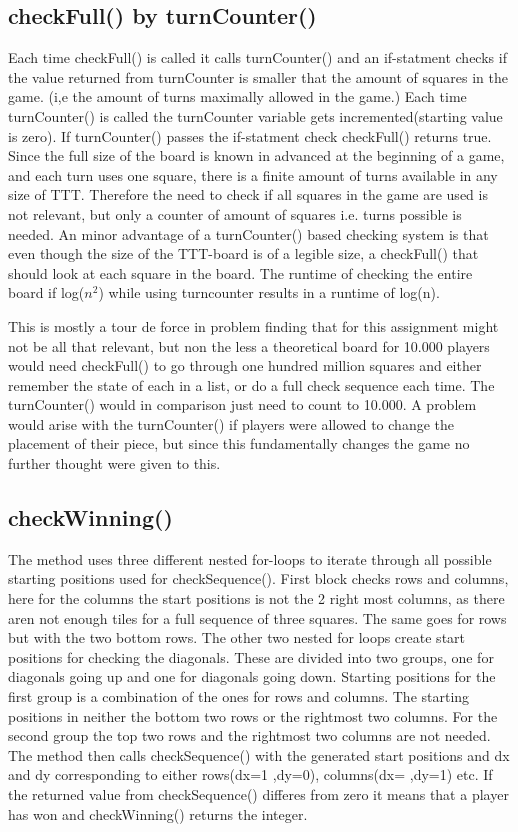 \documentclass[a4paper,10pt]{article}
\begin{document}
	\subsection{checkFull() by turnCounter()}
	Each time checkFull() is called it calls turnCounter() and an if-statment checks if the value returned from turnCounter is smaller that the amount of squares in the game. (i,e the amount of turns maximally allowed in the game.) Each time turnCounter() is called the turnCounter variable gets incremented(starting value is zero). If turnCounter() passes the if-statment check checkFull() returns true.
	Since the full size of the board is known in advanced at the beginning of a game, and each turn uses one square,  there is a finite amount of turns available in any size of TTT. Therefore the need to check if all squares in the game are used is not relevant, but only a counter of amount of squares i.e. turns possible is needed. 
	An minor advantage of a turnCounter() based checking system is that even though the size of the TTT-board is of a legible size, a checkFull() that should look at each square in the board. The runtime of checking the entire board if log($ n^{2} $) while using turncounter results in a runtime of log(n).
	
	This is mostly a tour de force in problem finding that for this assignment might not be all that relevant, but non the less a theoretical board for 10.000 players would need checkFull() to go through one hundred million squares and either remember the state of each in a list, or do a full check sequence each time. The turnCounter() would in comparison just need to count to 10.000.
	A problem would arise with the turnCounter() if players were allowed to change the placement of their piece, but since this fundamentally changes the game no further thought were given to this.
	
	\subsection{checkWinning()} 
	The method uses three different nested for-loops to iterate through all possible starting positions used for checkSequence(). First block checks rows and columns, here for the columns the start positions is not the 2 right most columns, as there aren not enough tiles for a full sequence of three squares. The same goes for rows but  with the two bottom  rows. 
	The other two nested for loops create start positions for checking the diagonals. These are divided into two groups, one for diagonals going up and  one for diagonals going down. Starting positions for the first group is a combination of the ones for rows and columns. The starting positions in neither the bottom two rows or the rightmost two columns. For the second group the top two rows and the rightmost two columns are not needed.
	The method then calls checkSequence() with the generated start positions and dx and dy corresponding to either rows(dx=1 ,dy=0), columns(dx= ,dy=1) etc.
	If the returned value from checkSequence() differes from zero it means that a player has won and checkWinning() returns the integer.
	
\end{document}
